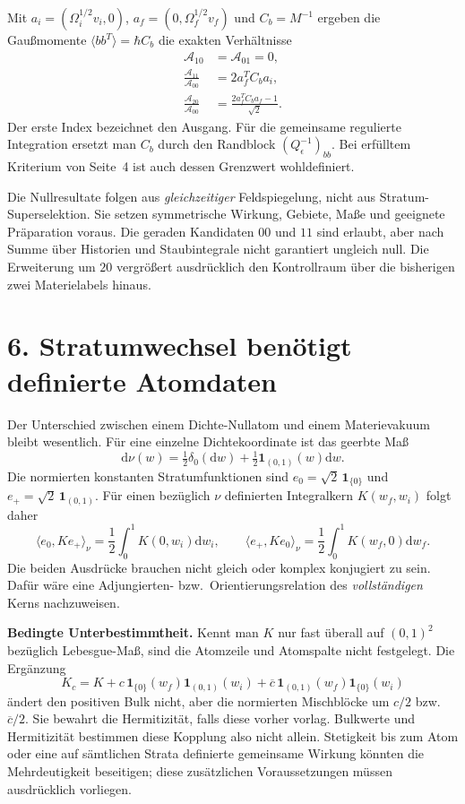 \documentclass[10pt,a4paper]{article}
\newcommand{\dd}{\mathrm d}
\newcommand{\sect}[1]{\section*{\color{navy}#1}}
\begin{document}
Mit $a_i=(\Omega_i^{1/2}v_i,0)$,
$a_f=(0,\Omega_f^{1/2}v_f)$ und $C_b=M^{-1}$ ergeben die Gaußmomente
$\langle bb^T\rangle=\hbar C_b$ die exakten Verhältnisse
\begin{align*}
\mathcal A_{10}&=\mathcal A_{01}=0,\\
\frac{\mathcal A_{11}}{\mathcal A_{00}}&=2a_f^TC_ba_i,\\
\frac{\mathcal A_{20}}{\mathcal A_{00}}&=
\frac{2a_f^TC_ba_f-1}{\sqrt2}.
\end{align*}
Der erste Index bezeichnet den Ausgang. Für die gemeinsame regulierte
Integration ersetzt man $C_b$ durch den Randblock $(Q_\epsilon^{-1})_{bb}$.
Bei erfülltem Kriterium von Seite~4 ist auch dessen Grenzwert wohldefiniert.

Die Nullresultate folgen aus \emph{gleichzeitiger} Feldspiegelung, nicht
aus Stratum-Superselektion. Sie setzen symmetrische Wirkung, Gebiete, Maße
und geeignete Präparation voraus. Die geraden Kandidaten $00$ und $11$
sind erlaubt, aber nach Summe über Historien und Staubintegrale nicht
garantiert ungleich null. Die Erweiterung um $20$ vergrößert ausdrücklich
den Kontrollraum über die bisherigen zwei Materielabels hinaus.

\newpage
\sect{6. Stratumwechsel benötigt definierte Atomdaten}
Der Unterschied zwischen einem Dichte-Nullatom und einem Materievakuum
bleibt wesentlich. Für eine einzelne Dichtekoordinate ist das geerbte Maß
\[
\dd\nu(w)=\tfrac12\delta_0(\dd w)+\tfrac12\mathbf1_{(0,1)}(w)\dd w.
\]
Die normierten konstanten Stratumfunktionen sind
$e_0=\sqrt2\,\mathbf1_{\{0\}}$ und
$e_+=\sqrt2\,\mathbf1_{(0,1)}$. Für einen bezüglich $\nu$ definierten
Integralkern $K(w_f,w_i)$ folgt daher
\[
\langle e_0,Ke_+\rangle_\nu=
\frac12\int_0^1 K(0,w_i)\dd w_i,
\qquad
\langle e_+,Ke_0\rangle_\nu=
\frac12\int_0^1 K(w_f,0)\dd w_f.
\]
Die beiden Ausdrücke brauchen nicht gleich oder komplex konjugiert zu
sein. Dafür wäre eine Adjungierten- bzw.~Orientierungsrelation des
\emph{vollständigen} Kerns nachzuweisen.

\textbf{Bedingte Unterbestimmtheit.}
Kennt man $K$ nur fast überall auf $(0,1)^2$ bezüglich Lebesgue-Maß,
sind die Atomzeile und Atomspalte nicht festgelegt. Die Ergänzung
\[
K_c=K+c\,\mathbf1_{\{0\}}(w_f)\mathbf1_{(0,1)}(w_i)
+\overline c\,\mathbf1_{(0,1)}(w_f)\mathbf1_{\{0\}}(w_i)
\]
ändert den positiven Bulk nicht, aber die normierten Mischblöcke um
$c/2$ bzw.~$\overline c/2$. Sie bewahrt die Hermitizität, falls diese
vorher vorlag. Bulkwerte und Hermitizität bestimmen diese Kopplung also
nicht allein. Stetigkeit bis zum Atom oder eine auf sämtlichen Strata
definierte gemeinsame Wirkung könnten die Mehrdeutigkeit beseitigen;
diese zusätzlichen Voraussetzungen müssen ausdrücklich vorliegen.
\end{document}
